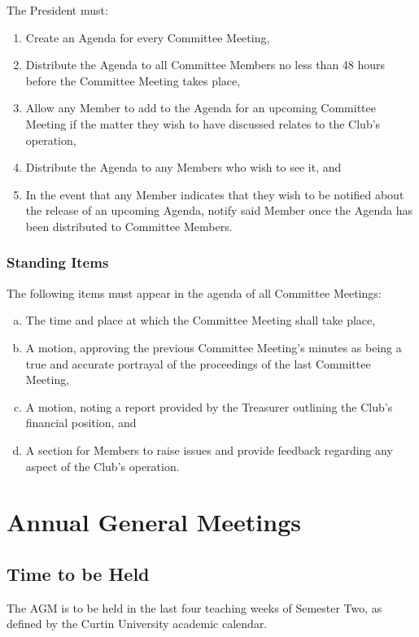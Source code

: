 \documentclass[a4paper,12pt]{article}
\begin{document}
The President must:

\begin{enumerate}
	\item Create an Agenda for every Committee Meeting,
	\item Distribute the Agenda to all Committee Members no less than 48 hours before the Committee Meeting takes place,
	\item Allow any Member to add to the Agenda for an upcoming Committee Meeting if the matter they wish to have discussed relates to the Club's operation,
	\item Distribute the Agenda to any Members who wish to see it, and
	\item In the event that any Member indicates that they wish to be notified about the release of an upcoming Agenda, notify said Member once the Agenda has been distributed to Committee Members.
\end{enumerate}

\subsubsection{Standing Items}

The following items must appear in the agenda of all Committee Meetings:

\begin{enumerate}[a)]
	\item The time and place at which the Committee Meeting shall take place,
	\item A motion, approving the previous Committee Meeting's minutes as being a true and accurate portrayal of the proceedings of the last Committee Meeting,
	\item A motion, noting a report provided by the Treasurer outlining the Club's financial position, and
	\item A section for Members to raise issues and provide feedback regarding any aspect of the Club's operation.
\end{enumerate}

\section{Annual General Meetings}

\subsection{Time to be Held}

The AGM is to be held in the last four teaching weeks of Semester Two, as defined by the Curtin University academic calendar.
\end{document}
